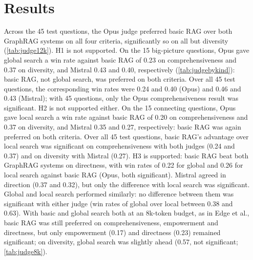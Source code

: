 \documentclass{article}
\begin{document}
\section{Results}
\label{sec:results}

\begin{table}[t]
\caption{Pairwise comparison on the test split (45 questions, both display orders), context budget
12k tokens. Each cell is the win rate of the first system of the pair (ties count as half); below 0.5 the
second system wins. * significant after Holm correction with both the sign test and the Wilcoxon
signed-rank test (per question, $\alpha = 0.05$).}
\label{tab:judge12k}
\vskip 0.05in
\begin{center}\begin{small}

\end{small}\end{center}
\end{table}

Across the 45 test questions, the Opus judge preferred basic RAG over both GraphRAG systems on all four
criteria, significantly so on all but diversity (\cref{tab:judge12k}).
H1 is not supported. On the 15 big-picture questions, Opus gave global search a win rate against basic
RAG of 0.23 on comprehensiveness and 0.37 on diversity, and Mistral 0.43 and 0.40, respectively
(\cref{tab:judgebykind}): basic RAG, not global search, was preferred on both criteria. Over all 45
test questions, the corresponding win rates were 0.24 and 0.40 (Opus) and 0.46 and 0.43 (Mistral);
with 45 questions, only the Opus comprehensiveness result was significant.
H2 is not supported either. On the 15 connecting questions, Opus gave local search a win rate against
basic RAG of 0.20 on comprehensiveness and 0.37 on diversity, and Mistral 0.35 and 0.27, respectively:
basic RAG was again preferred on both criteria. Over all 45 test questions, basic RAG's advantage over
local search was significant on comprehensiveness with both judges (0.24 and 0.37) and on diversity
with Mistral (0.27).
H3 is supported: basic RAG beat both GraphRAG systems on directness, with win rates of 0.22 for
global and 0.26 for local search against basic RAG (Opus, both significant). Mistral agreed in
direction (0.37 and 0.32), but only the difference with local search was significant.
Global and local search performed similarly: no difference between them was significant with either
judge (win rates of global over local between 0.38 and 0.63).
With basic and global search both at an 8k-token budget, as in Edge et al., basic RAG was still preferred on
comprehensiveness, empowerment and directness, but only empowerment (0.17) and directness (0.23)
remained significant; on diversity, global search was slightly ahead (0.57, not significant;
\cref{tab:judge8k}).
\end{document}
